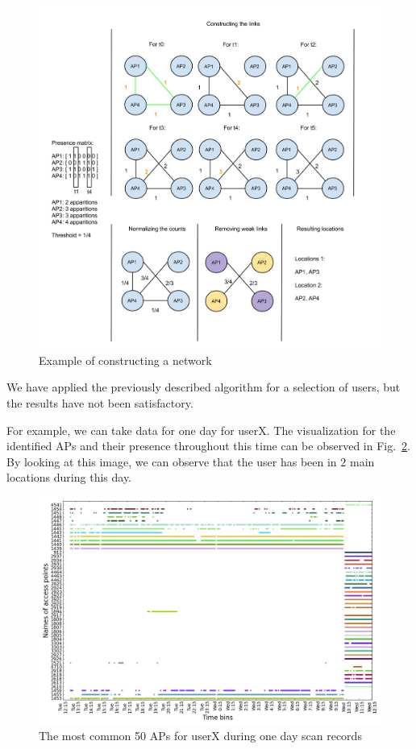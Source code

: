 \begin{figure}[!h]
\centering
\includegraphics[width=1\textwidth]{figures/networks/net_constr_ex.png}
\caption{Example of constructing a network}
\label{network_calc_example}
\end{figure}

We have applied the previously described algorithm for a selection of users, but
the results have not been satisfactory.

For example, we can take data for one day for userX. The visualization for the
identified APs and their presence throughout this time can be observed in
Fig.~\ref{user_6_pres_1d}. By looking at this image, we can observe that the
user has been in $2$ main locations during this day.

\begin{figure}[!h]
\centering
\includegraphics[width=\textwidth]{figures/networks/user_6_sorted_1days_no_rssi_plot.png}
\caption{The most common 50 APs for userX during one day scan records}
\label{user_6_pres_1d}
\end{figure}


